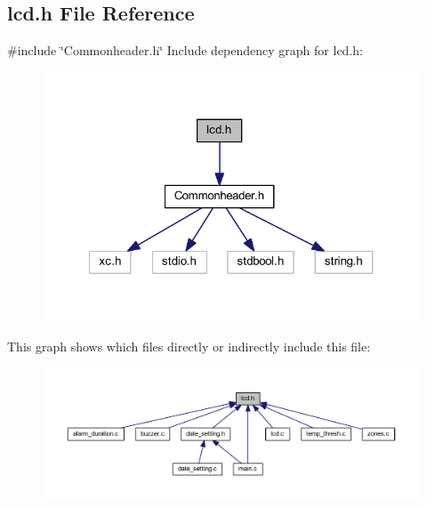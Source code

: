 \subsection{lcd.\+h File Reference}
\label{a00035}
{\ttfamily \#include \char`\"{}Commonheader.\+h\char`\"{}}\newline
Include dependency graph for lcd.\+h\+:
\nopagebreak
\begin{figure}[H]
\begin{center}
\leavevmode
\includegraphics[width=321pt]{a00036}
\end{center}
\end{figure}
This graph shows which files directly or indirectly include this file\+:
\nopagebreak
\begin{figure}[H]
\begin{center}
\leavevmode
\includegraphics[width=350pt]{a00037}
\end{center}
\end{figure}
